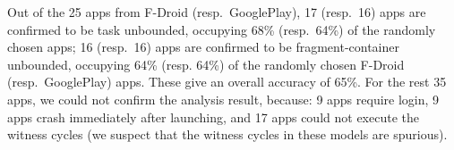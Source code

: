 Out of the 25 apps from F-Droid (resp.\ GooglePlay), 17 (resp.\ 16) apps are confirmed to be task unbounded, occupying 68\% (resp.\ 64\%) of the randomly chosen apps;  
16 (resp.\ 16) apps are confirmed to be fragment-container unbounded, occupying 64\% (resp. 64\%) of the randomly chosen F-Droid (resp.\ GooglePlay) apps. %
These give an overall accuracy of 65\%. 
For the rest 35 apps, we could not confirm the analysis result, because: %
9 apps require login, 9 apps crash immediately after launching, and 17 apps %
could not execute the witness cycles (we suspect that the witness cycles in these {\AMASS} models 
are spurious). %




